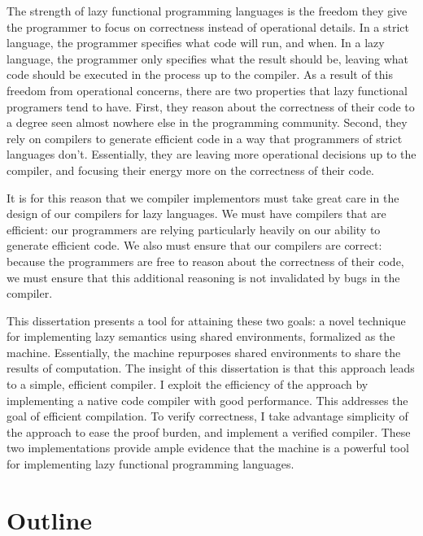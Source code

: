 The strength of lazy functional programming languages is the freedom they give
the programmer to focus on correctness instead of operational details. In a
strict language, the programmer specifies what code will run, and when. In a
lazy language, the programmer only specifies what the result should be, leaving
what code should be executed in the process up to the compiler. As a result of
this freedom from operational concerns, there are two properties that lazy
functional programers tend to have. First, they reason about the correctness of
their code to a degree seen almost nowhere else in the programming community.
Second, they rely on compilers to generate efficient code in a way that
programmers of strict languages don't.  Essentially, they are leaving more
operational decisions up to the compiler, and focusing their energy more on the
correctness of their code. 

It is for this reason that we compiler implementors must take great care in the
design of our compilers for lazy languages. We must have compilers that are
efficient: our programmers are relying particularly heavily on our ability to
generate efficient code. We also must ensure that our compilers are correct:
because the programmers are free to reason about the correctness of their code,
we must ensure that this additional reasoning is not invalidated by bugs in the
compiler. 

This dissertation presents a tool for attaining these two goals: a novel
technique for implementing lazy semantics using shared environments, formalized
as the \ce machine. Essentially, the \ce machine repurposes shared environments
to share the results of computation. The insight of this dissertation is that
this approach leads to a simple, efficient compiler. I exploit the efficiency of
the approach by implementing a native code compiler with good performance. This
addresses the goal of efficient compilation. To verify correctness, I take
advantage simplicity of the approach to ease the proof burden, and implement a
verified compiler. These two implementations provide ample evidence that the \ce
machine is a powerful tool for implementing lazy functional programming
languages.

\section{Outline}

